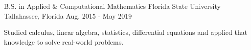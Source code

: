 

\begin{cventries}

  \cventry
    {B.S. in Applied \& Computational Mathematics} %
    {Florida State University} %
    {Tallahassee, Florida} %
    {Aug. 2015 - May 2019} %
    {
      \begin{cvitems} %
        \item {Studied calculus, linear algebra, statistics, differential equations and applied that knowledge to solve real-world problems.}
      \end{cvitems}
    }

\end{cventries}
